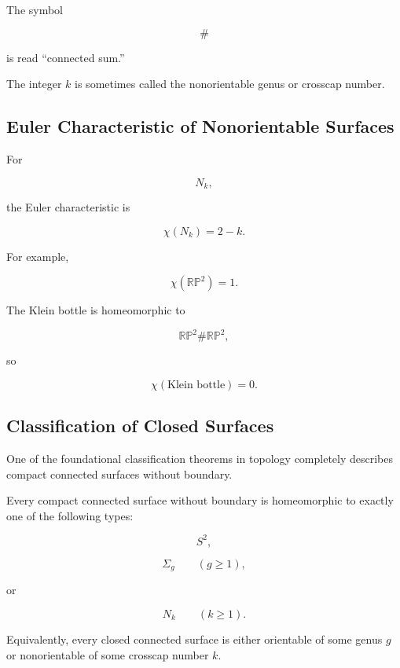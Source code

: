 The symbol

\[
\#
\]

is read ``connected sum.''

The integer \(k\) is sometimes called the nonorientable genus or
crosscap number.

\subsection{Euler Characteristic of Nonorientable Surfaces}
\label{subsec:euler-nonorientable-surfaces}

For

\[
N_k,
\]

the Euler characteristic is

\[
\boxed{
\chi(N_k)=2-k.
}
\]

For example,

\[
\chi(\mathbb{RP}^2)=1.
\]

The Klein bottle is homeomorphic to

\[
\mathbb{RP}^2\#\mathbb{RP}^2,
\]

so

\[
\boxed{
\chi(\text{Klein bottle})=0.
}
\]

\subsection{Classification of Closed Surfaces}
\label{subsec:classification-closed-surfaces}

One of the foundational classification theorems in topology completely
describes compact connected surfaces without boundary.

\begin{theorem}
Every compact connected surface without boundary is homeomorphic to exactly
one of the following types:

\[
\boxed{
S^2,
}
\]

\[
\boxed{
\Sigma_g
\qquad
(g\geq1),
}
\]

or

\[
\boxed{
N_k
\qquad
(k\geq1).
}
\]

Equivalently, every closed connected surface is either orientable of some
genus \(g\) or nonorientable of some crosscap number \(k\).
\end{theorem}

